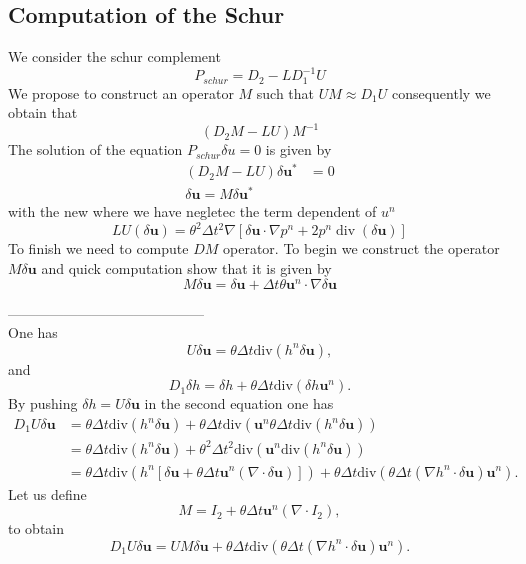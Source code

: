 \documentclass[a4paper, 11pt]{article}
\begin{document}
\subsection{Computation of the Schur}
We consider the schur complement
$$
P_{schur}=D_2-LD_1^{-1}U
$$
We propose to construct an operator $M$ such that $U M\approx D_1 U$ consequently we obtain that 
$$
(D_2 M-LU)M^{-1} 
$$
The solution of the equation $P_{schur}\delta u=0$ is given by
\begin{align*}
(D_2M-LU)\delta \boldsymbol{u}^* & =0\\
\delta \boldsymbol{u} = M \delta \boldsymbol{u}^*
\end{align*}
with the new where we have negletec the term dependent of $u^n$
\begin{equation*}
LU(\delta \boldsymbol{u})=\theta^2 \Delta t^2 \nabla\left[ \delta \boldsymbol{u}\cdot \nabla p^n + 2p^n \operatorname{div}(\delta \boldsymbol{u}) \right]
\end{equation*}
To finish we need to compute $DM$ operator. To begin we construct the operator $M \delta \boldsymbol{u}$ and quick computation show that  it is given by
$$
M \delta \boldsymbol{u} = \delta \boldsymbol{u} + \Delta t \theta \boldsymbol{u}^n \cdot \nabla \delta \boldsymbol{u}
$$


------------------------------------------\\
One has 
\begin{equation*}
U\delta \boldsymbol{u}=\theta\Delta t\text{div}(h^n\delta \boldsymbol{u}),
\end{equation*}
and 
\begin{equation*}
D_1\delta h=\delta h+\theta\Delta t\text{div}(\delta h\boldsymbol{u}^n).
\end{equation*}
By pushing $\delta h=U\delta \boldsymbol{u}$ in the second equation one has
\begin{equation*}
\begin{split}
D_1U\delta \boldsymbol{u}&=\theta\Delta t\text{div}(h^n\delta \boldsymbol{u})+\theta\Delta t\text{div}(\boldsymbol{u}^n\theta\Delta t\text{div}(h^n\delta \boldsymbol{u}))\\
&=\theta\Delta t\text{div}(h^n\delta \boldsymbol{u})+\theta^2\Delta t^2\text{div}(\boldsymbol{u}^n\text{div}(h^n\delta\boldsymbol{u}))\\
&=\theta\Delta t\text{div}\left(h^n\left[\delta \boldsymbol{u}+\theta\Delta t\boldsymbol{u}^n(\nabla\cdot \delta \boldsymbol{u})\right]\right)+\theta\Delta t\text{div}(\theta\Delta t\left(\nabla h^n\cdot \delta \boldsymbol{u}\right)\boldsymbol{u}^n).
\end{split}
\end{equation*}
Let us define 
\begin{equation*}
M=I_2+\theta\Delta t\boldsymbol{u}^n(\nabla\cdot I_2),
\end{equation*}
to obtain
\begin{equation*}
D_1U\delta \boldsymbol{u}=UM\delta \boldsymbol{u}+\theta\Delta t\text{div}(\theta\Delta t\left(\nabla h^n\cdot \delta \boldsymbol{u}\right)\boldsymbol{u}^n).
\end{equation*}
\end{document}
